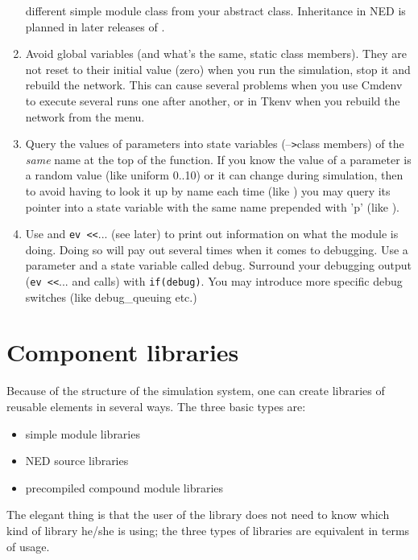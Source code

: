 \begin{enumerate}
{    different simple module class from your
    abstract class. Inheritance in NED is
    planned in later releases of {\opp}.}
\item{Avoid global variables (and what's the
    same, static class members).  They are not reset to their initial
    value (zero) when you run the simulation, stop it and rebuild the
    network. This can cause several problems when you use Cmdenv to
    execute several runs one after another, or in Tkenv when you
    rebuild the network from the menu.}
\item{Query the values of parameters into state variables
    (--\texttt{>}class members) of the \textit{same} name at the top
    of the  function.  If you know the value of a
    parameter is a random value (like uniform 0..10) or it can change
    during simulation, then to avoid having to look it up by name each
    time (like ) you may query its pointer into a
     state variable with the same name prepended with
    'p' (like ).}
  \item{Use  and \texttt{ev <}\texttt{<}... (see
    later) to print out information on what the module is doing. Doing
    so will pay out several times when it comes to debugging. Use a
    parameter and a state variable called debug. Surround your
    debugging output (\texttt{ev <}\texttt{<}... and
     calls) with \texttt{if(debug)}.  You may
    introduce more specific debug switches (like debug\_queuing etc.)}
\end{enumerate}




\section{Component libraries}

Because of the structure of the simulation system, one can create 
libraries of reusable elements in several ways. The three basic 
types are:
\begin{itemize}
\item{simple module libraries}
\item{NED source libraries}
\item{precompiled compound module libraries}
\end{itemize}

The elegant thing is that the user of the library does not need 
to know which kind of library he/she is using; the three types 
of libraries are equivalent in terms of usage.





